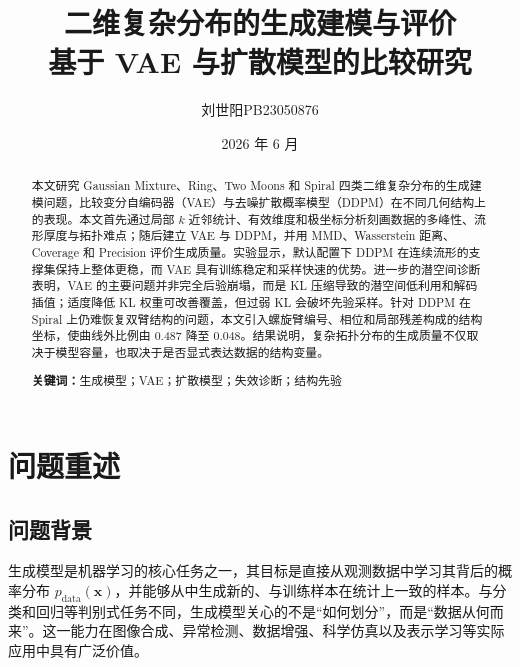 \documentclass[10pt, a4paper, oneside]{ctexart}
\title{\textbf{二维复杂分布的生成建模与评价}\\[0.6em]\large 基于 VAE 与扩散模型的比较研究}
\author{刘世阳\quad PB23050876}
\date{2026 年 6 月}
\numberwithin{equation}{section}
\numberwithin{table}{section}
\numberwithin{figure}{section}
\newcommand{\vect}[1]{\mathbf{#1}}
\begin{document}
\maketitle
\setcounter{page}{0}
\thispagestyle{empty}

\begin{abstract}
{\fontsize{10}{15}\selectfont
本文研究 Gaussian Mixture、Ring、Two Moons 和 Spiral 四类二维复杂分布的生成建模问题，比较变分自编码器（VAE）与去噪扩散概率模型（DDPM）在不同几何结构上的表现。本文首先通过局部 $k$ 近邻统计、有效维度和极坐标分析刻画数据的多峰性、流形厚度与拓扑难点；随后建立 VAE 与 DDPM，并用 MMD、Wasserstein 距离、Coverage 和 Precision 评价生成质量。实验显示，默认配置下 DDPM 在连续流形的支撑集保持上整体更稳，而 VAE 具有训练稳定和采样快速的优势。进一步的潜空间诊断表明，VAE 的主要问题并非完全后验崩塌，而是 KL 压缩导致的潜空间低利用和解码插值；适度降低 KL 权重可改善覆盖，但过弱 KL 会破坏先验采样。针对 DDPM 在 Spiral 上仍难恢复双臂结构的问题，本文引入螺旋臂编号、相位和局部残差构成的结构坐标，使曲线外比例由 $0.487$ 降至 $0.048$。结果说明，复杂拓扑分布的生成质量不仅取决于模型容量，也取决于是否显式表达数据的结构变量。
\par\textbf{关键词：}生成模型；VAE；扩散模型；失效诊断；结构先验
}
\end{abstract}

\pagestyle{fancy}
\fancyhf{}
\fancyheadoffset{0cm}
\renewcommand{\headrulewidth}{0pt}
\renewcommand{\footrulewidth}{0pt}
\fancyfoot[C]{\thepage}

\newpage
{}
\setcounter{page}{1}
\tableofcontents
\newpage
{}
\setcounter{page}{1}

\section{问题重述}

\subsection{问题背景}

生成模型是机器学习的核心任务之一，其目标是直接从观测数据中学习其背后的概率分布 $p_{\mathrm{data}}(\vect{x})$，并能够从中生成新的、与训练样本在统计上一致的样本。与分类和回归等判别式任务不同，生成模型关心的不是“如何划分”，而是“数据从何而来”。这一能力在图像合成、异常检测、数据增强、科学仿真以及表示学习等实际应用中具有广泛价值。
\end{document}
